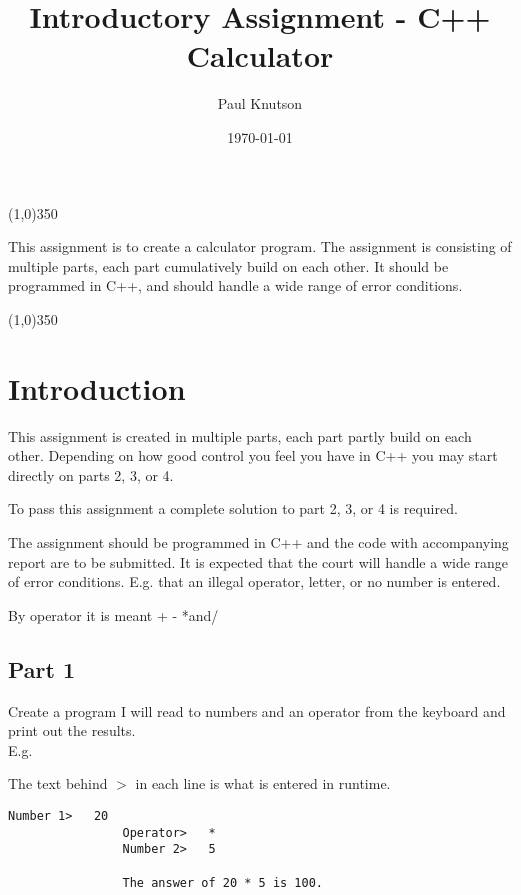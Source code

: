 \documentclass{article}
\begin{document}
	\title{Introductory Assignment - C++ Calculator}
	\date{\today}
	\author{Paul Knutson}
	\maketitle
	\thispagestyle{empty}
	
	\begin{center}
		\line(1,0){350}
	\end{center}
	
	\hfill \break
	This assignment is to create a calculator program.
	The assignment is consisting of multiple parts, each part cumulatively build on each other. It should be programmed in C++, and should handle a wide range of error conditions.
	
	\begin{center}
		\line(1,0){350}
	\end{center}
	
	\clearpage

	\tableofcontents{}
	\clearpage
	
	
	\section{Introduction}
		This assignment is created in multiple parts, each part partly build on each other. Depending on how good control you feel you have in C++ you may start directly on parts 2, 3, or 4.
		
		To pass this assignment a complete solution to part 2, 3, or 4 is required.
		
		The assignment should be programmed in C++ and the code with accompanying report are to be submitted. It is expected that the court will handle a wide range of error conditions. E.g. that an illegal operator, letter, or no number is entered.
		
		By operator it is meant + - *and/
		
		\subsection{Part 1}
			Create a program I will read to numbers and an operator from the keyboard and print out the results. \\
			
			E.g.
			
			The text behind $>$ in each line is what is entered in runtime.
			\begin{lstlisting}[numbers=none]
				Number 1>	20
				Operator>	*
				Number 2>	5
				
				The answer of 20 * 5 is 100.
			\end{lstlisting}
\end{document}
